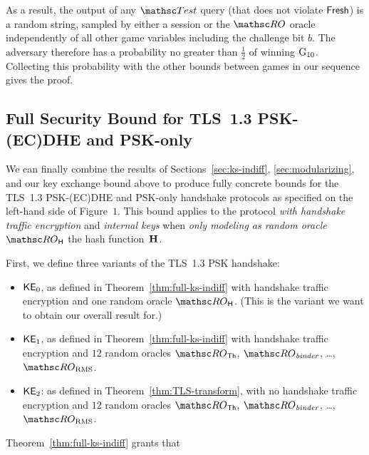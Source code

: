 As a result, the output of any $\Test$ query (that does not violate $\mathsf{Fresh}$) is a random string, sampled by either a session or the $\RO$ oracle independently of all other game variables including the challenge bit $b$.
The adversary therefore has a probability no greater than $\frac{1}{2}$ of winning $\textnormal{G}_{10}$.
Collecting this probability with the other bounds between games in our sequence gives the proof. %

\fi %

\subsection{Full Security Bound for TLS~1.3 PSK-(EC)DHE and PSK-only}
\label{sec:psk-ecdhe-ke-full-bound}

We can finally combine the results of Sections~\ref{sec:ks-indiff}, \ref{sec:modularizing}, and our key exchange bound above to produce fully concrete bounds for the TLS~1.3 PSK-(EC)DHE and PSK-only handshake protocols as specified on the left-hand side of Figure~$1$.
This bound applies to the protocol \emph{with handshake traffic encryption} and \emph{internal keys} when \emph{only modeling as random oracle}~$\ROhash$ the hash function~$\mathbf{H}$.

First, we define three variants of the TLS~1.3 PSK handshake:
\begin{itemize}
	\item $\mathsf{KE}_{0}$, as defined in Theorem~\ref{thm:full-ks-indiff} with handshake traffic encryption and one random oracle $\ROhash$.
		(This is the variant we want to obtain our overall result for.)	
		
	\item $\mathsf{KE}_{1}$, as defined in Theorem~\ref{thm:full-ks-indiff} with handshake traffic encryption and $12$ random oracles $\ROthash$, $\RObinder$, \dots, $\ROrms$.
	\item $\mathsf{KE}_{2}$: as defined in Theorem~\ref{thm:TLS-transform}, with no handshake traffic encryption and $12$ random oracles $\ROthash$, $\RObinder$, \dots, $\ROrms$.
\end{itemize}

Theorem~\ref{thm:full-ks-indiff} grants that

